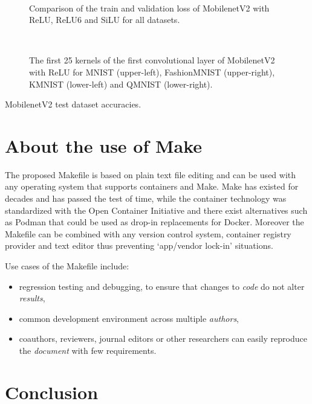 \documentclass[journal]{IEEEtran}
\begin{document}
\begin{figure}[!t]
	\\
	\caption{Comparison of the train and validation loss of MobilenetV2 with ReLU, ReLU6 and SiLU for all datasets.}\label{fig:loss}
\end{figure}

\begin{figure}[!t]
	\\
	\caption{The first 25 kernels of the first convolutional layer of MobilenetV2 with ReLU for MNIST (upper-left), FashionMNIST (upper-right), KMNIST (lower-left) and QMNIST (lower-right).}\label{fig:kernels}
\end{figure}

\begin{table}[ht]
	\centering
	\caption{MobilenetV2 test dataset accuracies.}\label{table:table}
	\setlength\tabcolsep{4pt}
	
\end{table}

\section{About the use of Make}
The proposed Makefile is based on plain text file editing and can be used with any operating system that supports containers and Make.
Make has existed for decades and has passed the test of time, while the container technology was standardized with the Open Container Initiative and there exist alternatives such as Podman that could be used as drop-in replacements for Docker.
Moreover the Makefile can be combined with any version control system, container registry provider and text editor thus preventing `app/vendor lock-in' situations.

Use cases of the Makefile include:
\begin{itemize}
	\item regression testing and debugging, to ensure that changes to \textit{code} do not alter \textit{results},
	\item common development environment across multiple \textit{authors},
	\item coauthors, reviewers, journal editors or other researchers can easily reproduce the \textit{document} with few requirements.
\end{itemize}

\section*{Conclusion}



\end{document}
